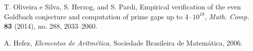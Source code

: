 \documentclass[a4paper,11pt]{article}
\theoremstyle{definition}
\theoremstyle{remark}
\begin{document}
\begin{otherlanguage}{brazil}
\begin{thebibliography}{9}
		T. Oliveira e Silva, S. Herzog, and S. Pardi,
		Empirical verification of the even Goldbach conjecture and computation of prime gaps up to \(4 \cdot 10^{18}\),
		\textit{Math. Comp.} \textbf{83} (2014), no. 288, 2033--2060.
		
		A. Hefez,
		\textit{Elementos de Aritmética},
		Sociedade Brasileira de Matemática, 2006.
		
		
		
		
		
		
	\end{thebibliography}
    \end{otherlanguage}
	
\end{document}
